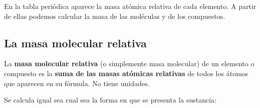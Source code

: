 En la tabla periódica aparece la masa atómica relativa de cada elemento. A partir de ellas podemos calcular la masa de las moléculas y de los compuestos.

\subsection{La masa molecular relativa}

\begin{definition}
    La \textbf{masa molecular relativa} (o simplemente masa molecular) de un elemento o compuesto es la \textbf{suma de las masas atómicas relativas} de todos los átomos que aparecen en su fórmula. No tiene unidades.
\end{definition}

Se calcula igual sea cual sea la forma en que se presenta la sustancia:

